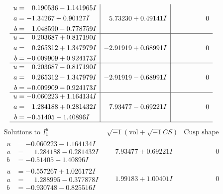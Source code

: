 \documentclass[1p]{elsarticle_modified}
\theoremstyle{definition}
\newcommand{\I}{\sqrt{-1}}
\begin{document}
$$\begin{array}{c|c|c}
\begin{aligned}
u &= \phantom{-}0.190536 - 1.141965 I \\
a &= -1.34267 + 0.90127 I \\
b &= \phantom{-}1.048590 - 0.778759 I\end{aligned}
 & \phantom{-}5.73230 + 0.49141 I & \phantom{-0.000000 } 0 \\ \hline\begin{aligned}
u &= \phantom{-}0.203687 + 0.817190 I \\
a &= \phantom{-}0.265312 + 1.347979 I \\
b &= -0.009909 + 0.924173 I\end{aligned}
 & -2.91919 + 0.68991 I & \phantom{-0.000000 } 0 \\ \hline\begin{aligned}
u &= \phantom{-}0.203687 - 0.817190 I \\
a &= \phantom{-}0.265312 - 1.347979 I \\
b &= -0.009909 - 0.924173 I\end{aligned}
 & -2.91919 - 0.68991 I & \phantom{-0.000000 } 0 \\ \hline\begin{aligned}
u &= -0.060223 + 1.164134 I \\
a &= \phantom{-}1.284188 + 0.281432 I \\
b &= -0.51405 - 1.40896 I\end{aligned}
 & \phantom{-}7.93477 - 0.69221 I & \phantom{-0.000000 } 0\\
 \hline 
 \end{array}$$\newpage$$\begin{array}{c|c|c}  
\text{Solutions to }I^u_{1}& \I (\text{vol} + \sqrt{-1}CS) & \text{Cusp shape}\\
 \hline 
\begin{aligned}
u &= -0.060223 - 1.164134 I \\
a &= \phantom{-}1.284188 - 0.281432 I \\
b &= -0.51405 + 1.40896 I\end{aligned}
 & \phantom{-}7.93477 + 0.69221 I & \phantom{-0.000000 } 0 \\ \hline\begin{aligned}
u &= -0.557267 + 1.026172 I \\
a &= \phantom{-}1.288995 - 0.377878 I \\
b &= -0.930748 - 0.825516 I\end{aligned}
 & \phantom{-}1.99183 + 1.00401 I & \phantom{-0.000000 } 0 \\ \hline\begin{aligned}

\end{aligned}
\end{array}$$
\end{document}
